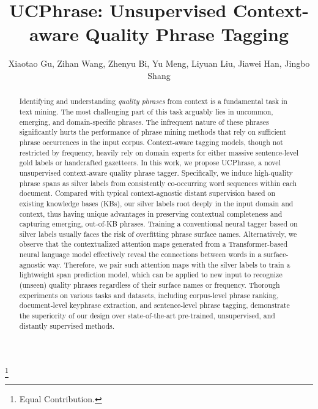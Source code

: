 \documentclass[sigconf]{acmart}
\newcommand{\our}{\mbox{UCPhrase}\xspace}
\begin{document}

\title{\our: Unsupervised Context-aware Quality Phrase Tagging}

\author{Xiaotao Gu, Zihan Wang, Zhenyu Bi, Yu Meng, Liyuan Liu, Jiawei Han, Jingbo Shang}
\renewcommand{\shortauthors}{Xiaotao Gu and Zihan Wang, et al.}

\thanks{Equal Contribution.}
\begin{abstract}
Identifying and understanding \emph{quality phrases} from context is a fundamental task in text mining.  
The most challenging part of this task arguably lies in uncommon, emerging, and domain-specific phrases. 
The infrequent nature of these phrases significantly hurts the performance of phrase mining methods that rely on sufficient phrase occurrences in the input corpus.
Context-aware tagging models, though not restricted by frequency, heavily rely on domain experts for either massive sentence-level gold labels or handcrafted gazetteers.
In this work, we propose \our, a novel unsupervised context-aware quality phrase tagger.
Specifically, we induce high-quality phrase spans as silver labels from consistently co-occurring
word sequences within each document.
Compared with typical context-agnostic distant supervision based on existing knowledge bases (KBs), our silver labels root deeply in the input domain and context, thus having unique advantages in preserving
contextual completeness 
and capturing emerging, out-of-KB phrases.
Training a conventional neural tagger based on silver labels usually faces the risk of overfitting phrase surface names.
Alternatively, we observe that the contextualized attention maps generated from a Transformer-based neural language model effectively reveal the connections between words in a surface-agnostic way.
Therefore, we pair such attention maps with the silver labels to train a lightweight span prediction model, which can be applied to new input to recognize (unseen) quality phrases regardless of their surface names or frequency. 
Thorough experiments on various tasks and datasets, including corpus-level phrase ranking, document-level keyphrase extraction, and sentence-level phrase tagging, demonstrate the superiority of our design over state-of-the-art pre-trained, unsupervised, and distantly supervised methods.
 \end{abstract}
\end{document}
